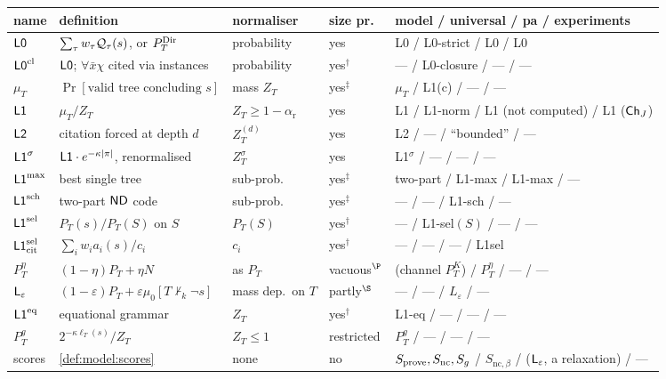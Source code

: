\begin{table}[ht]
\crefabbrev
\centering\footnotesize\setlength{\tabcolsep}{4pt}
\begin{tabularx}{\textwidth}{@{}lXllp{4.6cm}@{}}
\toprule
name & definition & normaliser & size pr. & model / universal / pa / experiments\\
\midrule
$\mathord{\mathsf{L0}}$ & $\sum_\tau w_\tau\mathcal{Q}_\tau(s)$, or $P^{\mathrm{Dir}}_{T}$ & probability & yes & L0 / L0-strict / L0 / L0\\
$\mathord{\mathsf{L0}}^{\mathrm{cl}}$ & $\mathord{\mathsf{L0}}$; $\forall\bar x\chi$ cited via instances & probability & yes$^\dagger$ & --- / L0-closure / --- / ---\\
$\mu_T$ & $\Pr[\text{valid tree concluding }s]$ & mass $Z_T$ & yes$^\ddagger$ & $\mu_T$ / L1(c) / --- / ---\\
$\mathord{\mathsf{L1}}$ & $\mu_T/Z_T$ & $Z_T\ge1-\alpha_{\mathrm r}$ & yes & L1 / L1-norm / L1 (not computed) / L1 ($\mathsf{Ch}_{J}$)\\
$\mathord{\mathsf{L2}}$ & citation forced at depth $d$ & $Z^{(d)}_T$ & yes & L2 / --- / ``bounded'' / ---\\
$\mathord{\mathsf{L1}}^{\sigma}$ & $\mathord{\mathsf{L1}}\cdot e^{-\kappa|\pi|}$, renormalised & $Z^\sigma_T$ & yes & L1$^\sigma$ / --- / --- / ---\\
$\mathord{\mathsf{L1}}^{\max}$ & best single tree & sub-prob. & yes$^\ddagger$ & two-part / L1-max / L1-max / ---\\
$\mathord{\mathsf{L1}}^{\mathrm{sch}}$ & two-part $\mathsf{ND}$ code & sub-prob. & yes$^\ddagger$ & --- / --- / L1-sch / ---\\
$\mathord{\mathsf{L1}}^{\mathrm{sel}}$ & $P_T(s)/P_T(S)$ on $S$ & $P_T(S)$ & yes$^\dagger$ & --- / L1-sel$(S)$ / --- / ---\\
$\mathord{\mathsf{L1}}^{\mathrm{sel}}_{\mathrm{cit}}$ & $\sum_iw_ia_i(s)/c_i$ & $c_i$ & yes$^\dagger$ & --- / --- / --- / L1sel\\
$P^\eta_T$ & $(1-\eta)P_T+\eta N$ & as $P_T$ & vacuous$^\P$ & (channel $P^K_T$) / $P^\eta_T$ / --- / ---\\
$\mathsf{L}_{\varepsilon}$ & $(1-\varepsilon)P_T+\varepsilon\mu_0[T\nvdash_k\neg s]$ & mass dep.\ on $T$ & partly$^\S$ & --- / --- / $L_\varepsilon$ / ---\\
$\mathord{\mathsf{L1}}^{\mathrm{eq}}$ & equational grammar & $Z_T$ & yes$^\dagger$ & L1-eq / --- / --- / ---\\
$P^g_T$ & $2^{-\kappa\ell_T(s)}/Z_T$ & $Z_T\le1$ & restricted & $P^g_T$ / --- / --- / ---\\
scores & \cref{def:model:scores} & none & no & $S_{\mathrm{prove}},S_{\mathrm{nc}},S_{g}$ / $S_{\mathrm{nc},\beta}$ / ($\mathsf{L}_{\varepsilon}$, a relaxation) / ---\\
\bottomrule
\end{tabularx}

\end{table}
